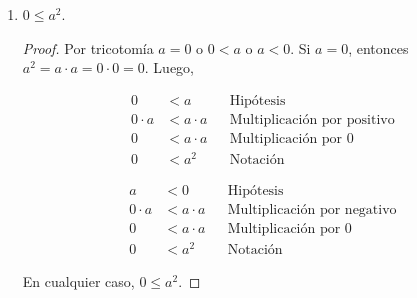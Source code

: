 \documentclass[11pt]{article}
\begin{document}
\begin{enumerate}[label=\alph*)]
    \item $0\leq a^2$.
    \vspace{-1em}\begin{proof} 
        Por tricotomía $a=0$ o $0<a$ o $a<0$. Si $a=0$, entonces $a^2=a\cdot a =0 \cdot 0 =0$. Luego,
        \begin{center}\vspace{-1em}
            \begin{minipage}[l]{.5\linewidth}
                \begin{align*}
                    0 &< a && \text{Hipótesis}\\
                    0 \cdot a &< a \cdot a && \text{Multiplicación por positivo}\\
                    0 &< a \cdot a && \text{Multiplicación por 0}\\
                    0 &< a^2 && \text{Notación}
                \end{align*}
            \end{minipage}%
            \begin{minipage}[r]{.5\linewidth}
                \begin{align*}
                    a &< 0 && \text{Hipótesis}\\
                    0 \cdot a &< a\cdot a && \text{Multiplicación por negativo}\\
                    0 &< a\cdot a && \text{Multiplicación por 0}\\
                    0 &< a^2 && \text{Notación}
                \end{align*}
            \end{minipage}
        \end{center} En cualquier caso, $0\leq a^2$.
    \end{proof} \vspace{-1em}
    

\end{enumerate}
\end{document}
